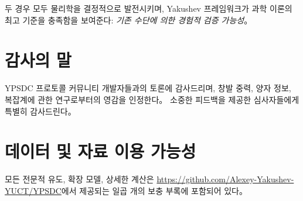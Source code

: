 \documentclass[11pt,a4paper]{article}
\begin{document}
두 경우 모두 물리학을 결정적으로 발전시키며, Yakushev 프레임워크가 과학 이론의 최고 기준을 충족함을 보여준다: \emph{기존 수단에 의한 경험적 검증 가능성}。

\section*{감사의 말}
YPSDC 프로토콜 커뮤니티 개발자들과의 토론에 감사드리며, 창발 중력, 양자 정보, 복잡계에 관한 연구로부터의 영감을 인정한다。 소중한 피드백을 제공한 심사자들에게 특별히 감사드린다。

\section*{데이터 및 자료 이용 가능성}
모든 전문적 유도, 확장 모델, 상세한 계산은 \url{https://github.com/Alexey-Yakushev-YUCT/YPSDC}에서 제공되는 일곱 개의 보충 부록에 포함되어 있다。
\end{document}
